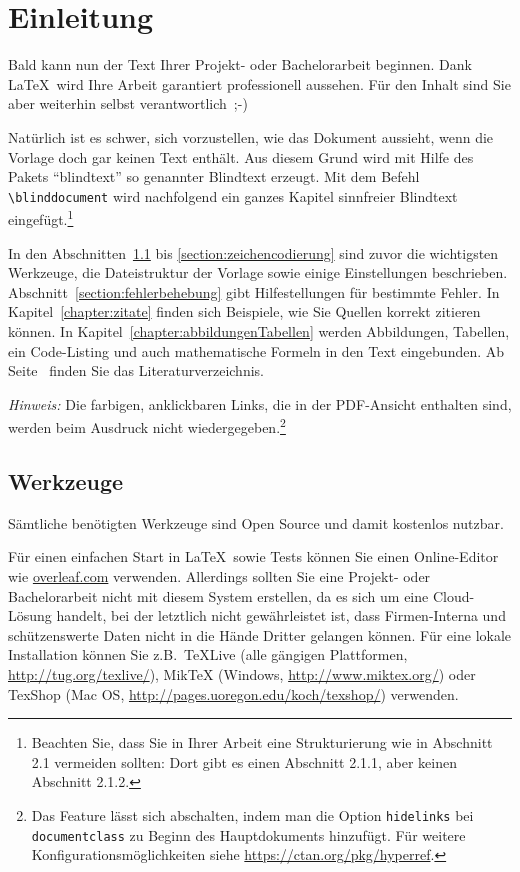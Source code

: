 \chapter{Einleitung}

Bald kann nun der Text Ihrer Projekt- oder Bachelorarbeit beginnen. Dank \LaTeX\ wird Ihre Arbeit garantiert professionell aussehen. Für den Inhalt sind Sie aber weiterhin selbst verantwortlich~\mbox{;-)}

Natürlich ist es schwer, sich vorzustellen, wie das Dokument aussieht, wenn die Vorlage doch gar keinen Text enthält. Aus diesem Grund wird mit Hilfe des Pakets \enquote{blindtext} so genannter Blindtext erzeugt. Mit dem Befehl \verb|\blinddocument| wird nachfolgend ein ganzes Kapitel sinnfreier Blindtext eingefügt.\footnote{Beachten Sie, dass Sie in Ihrer Arbeit eine Strukturierung wie in Abschnitt 2.1 vermeiden sollten: Dort gibt es einen Abschnitt 2.1.1, aber keinen Abschnitt 2.1.2.} 

In den Abschnitten~\ref{section:werkzeuge} bis \ref{section:zeichencodierung} sind zuvor die wichtigsten Werkzeuge, die Dateistruktur der Vorlage sowie einige Einstellungen beschrieben. Abschnitt~\ref{section:fehlerbehebung} gibt Hilfestellungen für bestimmte Fehler. In Kapitel~\ref{chapter:zitate} finden sich Beispiele, wie Sie Quellen korrekt zitieren können. In Kapitel~\ref{chapter:abbildungenTabellen} werden Abbildungen, Tabellen, ein Code-Listing und auch mathematische Formeln in den Text eingebunden. Ab Seite~\pageref{chapter:quellen} finden Sie das Literaturverzeichnis.

\emph{Hinweis:} Die farbigen, anklickbaren Links, die in der PDF-Ansicht enthalten sind, werden beim Ausdruck nicht wiedergegeben.\footnote{Das Feature lässt sich abschalten, indem man die Option \texttt{hidelinks} bei \texttt{documentclass} zu Beginn des Hauptdokuments hinzufügt. Für weitere Konfigurationsmöglichkeiten siehe \url{https://ctan.org/pkg/hyperref}.}

\section{Werkzeuge}\label{section:werkzeuge}

Sämtliche benötigten Werkzeuge sind Open Source und damit kostenlos nutzbar.

Für einen einfachen Start in \LaTeX\ 
sowie Tests können Sie einen Online-Editor wie \url{overleaf.com} verwenden. 
Allerdings sollten Sie eine Projekt- oder Bachelorarbeit nicht mit diesem System erstellen, da es sich um eine Cloud-Lösung handelt, bei der letztlich nicht gewährleistet ist, dass Firmen-Interna und schützenswerte Daten nicht in die Hände Dritter gelangen können. 
Für eine lokale Installation können Sie z.B.\ TeXLive (alle gängigen Plattformen, \url{http://tug.org/texlive/}), MikTeX (Windows, \url{http://www.miktex.org/}) oder TexShop (Mac OS, \url{http://pages.uoregon.edu/koch/texshop/}) verwenden.

